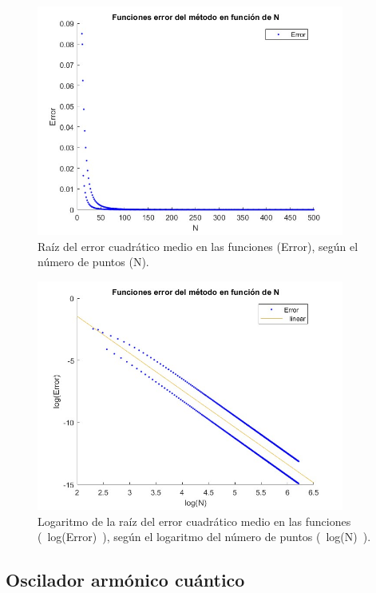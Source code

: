 \documentclass[12pt]{article}
\begin{document}
   \begin{figure}[H]
        \centering
        \includegraphics[width=0.9\textwidth]{fotos/errorr_funci_infinito_500.jpg}
        \caption{Raíz del error cuadrático medio en las funciones (Error), según el número de puntos (N).}
        \end{figure} 

    \begin{figure}[H]
        \centering
        \includegraphics[width=0.9\textwidth]{fotos/logerror_funci_infinito_500.jpg}
        \caption{Logaritmo de la raíz del error cuadrático medio en las funciones (~log(Error)~), según el logaritmo del número de puntos (~log(N)~).}
        \end{figure}
    
    \subsection{Oscilador armónico cuántico}
\end{document}
